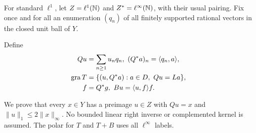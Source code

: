 For standard $\ell^1$, let $Z=\ell^1(\mathbb N)$ and $Z^*=\ell^\infty(\mathbb N)$,
with their usual pairing. Fix once and for all an enumeration $(q_n)$ of
all finitely supported rational vectors in the closed unit ball of $Y$.
\begin{definition}
Define
\begin{equation}
\begin{aligned}
Qu&=\sum_{n\ge1}u_nq_n,~(Q^*a)_n=\langle q_n,a\rangle,\\
\operatorname{gra} T&=\{(u,Q^*a):a\in D,\ Qu=La\},\\
f&=Q^*g, ~Bu=\langle u,f\rangle f.
\end{aligned}
\label{eq:D10}
\end{equation}
\end{definition}
We prove that every $x\in Y$ has a preimage $u\in Z$ with
$Qu=x$ and $\|u\|_1\le2\|x\|_\infty$. No bounded linear
right inverse or complemented kernel is assumed. The polar for $T$ and
$T+B$ uses all $\ell^\infty$ labels.

